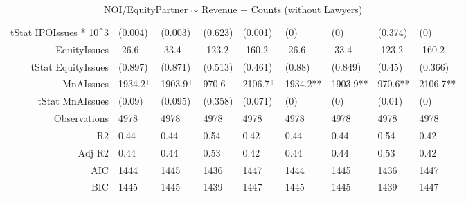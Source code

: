 \begin{table}[ht]
\begin{tabular}{rllllllll}
  tStat IPOIssues * 10^3 & (0.004) & (0.003) & (0.623) & (0.001) & (0) & (0) & (0.374) & (0) \\ 
  EquityIssues & -26.6 & -33.4 & -123.2 & -160.2 & -26.6 & -33.4 & -123.2 & -160.2 \\ 
  tStat EquityIssues & (0.897) & (0.871) & (0.513) & (0.461) & (0.88) & (0.849) & (0.45) & (0.366) \\ 
  MnAIssues & 1934.2$^{+}$ & 1903.9$^{+}$ & 970.6 & 2106.7$^{+}$ & 1934.2** & 1903.9** & 970.6** & 2106.7** \\ 
  tStat MnAIssues & (0.09) & (0.095) & (0.358) & (0.071) & (0) & (0) & (0.01) & (0) \\ 
  Observations & 4978 & 4978 & 4978 & 4978 & 4978 & 4978 & 4978 & 4978 \\ 
  R2 & 0.44 & 0.44 & 0.54 & 0.42 & 0.44 & 0.44 & 0.54 & 0.42 \\ 
  Adj R2 & 0.44 & 0.44 & 0.53 & 0.42 & 0.44 & 0.44 & 0.53 & 0.42 \\ 
  AIC & 1444 & 1445 & 1436 & 1447 & 1444 & 1445 & 1436 & 1447 \\ 
  BIC & 1445 & 1445 & 1439 & 1447 & 1445 & 1445 & 1439 & 1447 \\ 
   \hline
\end{tabular}
\caption{NOI/EquityPartner $\sim$ Revenue + Counts (without Lawyers)} 
\end{table}
